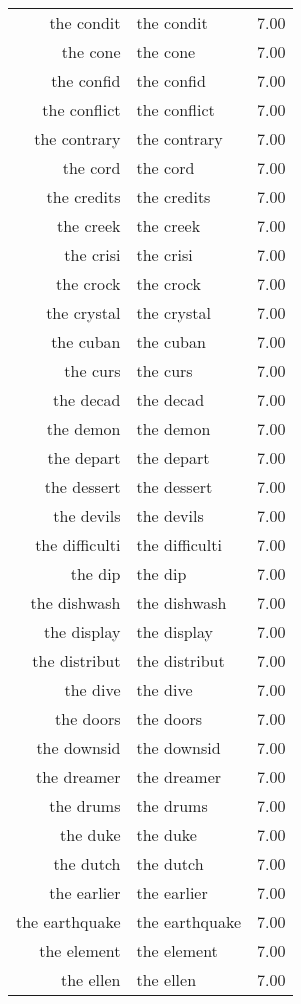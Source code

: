 \begin{table}[ht]
\begin{tabular}{rlr}
  the condit & the condit & 7.00 \\ 
  the cone & the cone & 7.00 \\ 
  the confid & the confid & 7.00 \\ 
  the conflict & the conflict & 7.00 \\ 
  the contrary & the contrary & 7.00 \\ 
  the cord & the cord & 7.00 \\ 
  the credits & the credits & 7.00 \\ 
  the creek & the creek & 7.00 \\ 
  the crisi & the crisi & 7.00 \\ 
  the crock & the crock & 7.00 \\ 
  the crystal & the crystal & 7.00 \\ 
  the cuban & the cuban & 7.00 \\ 
  the curs & the curs & 7.00 \\ 
  the decad & the decad & 7.00 \\ 
  the demon & the demon & 7.00 \\ 
  the depart & the depart & 7.00 \\ 
  the dessert & the dessert & 7.00 \\ 
  the devils & the devils & 7.00 \\ 
  the difficulti & the difficulti & 7.00 \\ 
  the dip & the dip & 7.00 \\ 
  the dishwash & the dishwash & 7.00 \\ 
  the display & the display & 7.00 \\ 
  the distribut & the distribut & 7.00 \\ 
  the dive & the dive & 7.00 \\ 
  the doors & the doors & 7.00 \\ 
  the downsid & the downsid & 7.00 \\ 
  the dreamer & the dreamer & 7.00 \\ 
  the drums & the drums & 7.00 \\ 
  the duke & the duke & 7.00 \\ 
  the dutch & the dutch & 7.00 \\ 
  the earlier & the earlier & 7.00 \\ 
  the earthquake & the earthquake & 7.00 \\ 
  the element & the element & 7.00 \\ 
  the ellen & the ellen & 7.00 \\ 

\end{tabular}
\end{table}

